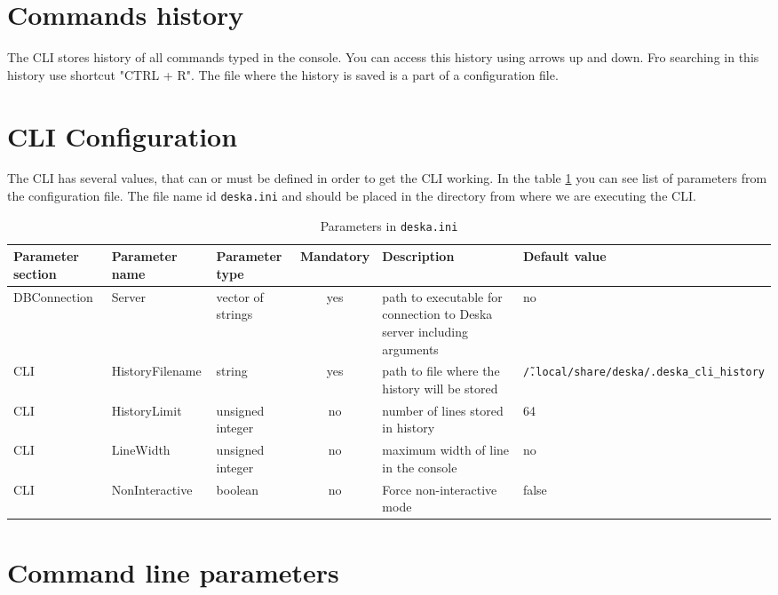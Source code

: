 \documentclass[deska]{subfiles}
\begin{document}
\section{Commands history}

The CLI stores history of all commands typed in the console. You can access this history using arrows up and down. Fro
searching in this history use shortcut "CTRL + R". The file where the history is saved is a part of a configuration
file.

\section{CLI Configuration}

The CLI has several values, that can or must be defined in order to get the CLI working. In the table \ref{tab:configfile}
you can see list of parameters from the configuration file. The file name id {\tt deska.ini} and should be placed in
the directory from where we are executing the CLI.


\begin{longtable}{ l | l | p{2.5cm} | c |  p{4cm} | p{3cm} }
    \caption{Parameters in {\tt deska.ini}}
    \label{tab:configfile} \\
    Parameter section & Parameter name & Parameter type & Mandatory & Description & Default value \\
    \hline
    \endhead
    DBConnection & Server & vector of strings & yes & path to executable for connection to Deska server including arguments & no \\
    CLI & HistoryFilename & string & yes & path to file where the history will be stored & {\tt \~/.local/share/deska/.deska\_cli\_history} \\
    CLI & HistoryLimit & unsigned integer & no & number of lines stored in history & 64 \\
    CLI & LineWidth & unsigned integer & no & maximum width of line in the console & no \\
    CLI & NonInteractive & boolean & no & Force non-interactive mode & false \\
    \hline
\end{longtable}

\section{Command line parameters}
\end{document}
